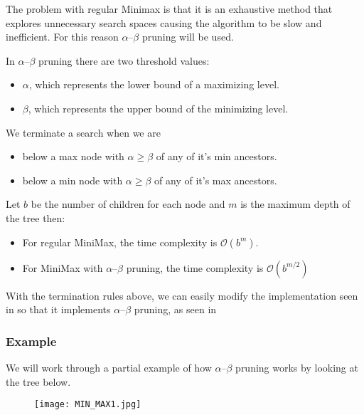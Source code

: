The problem with regular Minimax is that it is an exhaustive method that explores unnecessary search spaces causing the algorithm to be slow and inefficient. For this reason $\alpha$--$\beta$ pruning will be used.

In $\alpha$--$\beta$ pruning there are two threshold values:
\begin{itemize}
    \item $\alpha$, which represents the lower bound of a maximizing level.
    \item $\beta$, which represents the upper bound of the minimizing level.
\end{itemize}

We terminate a search when we are
\begin{itemize}
    \item below a max node with $\alpha \geq \beta$ of any of it's min ancestors.
    \item below a min node with $\alpha \geq \beta$ of any of it's max ancestors.
\end{itemize}

Let $b$ be the number of children for each node and $m$ is the maximum depth of the tree then:
\begin{itemize}
    \item For regular MiniMax, the time complexity is $\mathcal{O}(b^m)$.
    \item For MiniMax with $\alpha$--$\beta$ pruning, the time complexity is $\mathcal{O}(b^{m/2})$
\end{itemize}

With the termination rules above, we can easily modify the implementation seen in  so that it implements $\alpha$--$\beta$ pruning, as seen in 

\subsubsection{Example}

We will work through a partial example of how $\alpha$--$\beta$ pruning works by looking at the tree below.

\begin{figure}
    \centering
    \texttt{[image: MIN\_MAX1.jpg]}
\end{figure}

